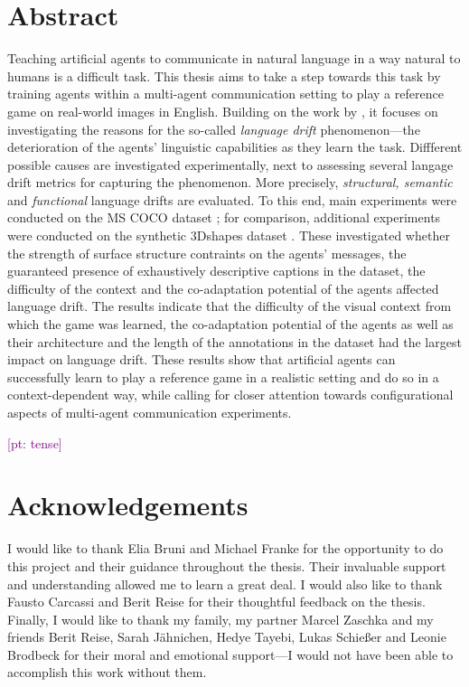 \documentclass[11pt, twoside, openright]{report} %
\newcommand{\pt}[1]{\textcolor{Purple}{[pt: #1]}}
\begin{document}


\chapter*{Abstract}
Teaching artificial agents to communicate in natural language in a way natural to humans is a difficult task. This thesis aims to take a step towards this task by training agents within a multi-agent communication setting to play a reference game on real-world images in English. Building on the work by \cite{lazaridou2020multi}, it focuses on investigating the reasons for the so-called \emph{language drift} phenomenon---the deterioration of the agents' linguistic capabilities as they learn the task. Diffferent possible causes are investigated experimentally, next to assessing several langage drift metrics for capturing the phenomenon. More precisely, \emph{structural, semantic} and \emph{functional} language drifts are evaluated.
To this end, main experiments were conducted on the MS COCO dataset \parencite{chen2015microsoft}; for comparison, additional experiments were conducted on the synthetic 3Dshapes dataset \parencite{burgess20183d}.
These investigated whether the strength of surface structure contraints on the agents' messages, the guaranteed presence of exhaustively descriptive captions in the dataset, the difficulty of the context and the co-adaptation potential of the agents affected language drift. The results indicate that the difficulty of the visual context from which the game was learned, the co-adaptation potential of the agents as well as their architecture and the length of the annotations in the dataset had the largest impact on language drift. These results show that artificial agents can successfully learn to play a reference game in a realistic setting and do so in a context-dependent way, while calling for closer attention towards configurational aspects of multi-agent communication experiments.  

\pt{tense}
\chapter*{Acknowledgements}

I would like to thank Elia Bruni and Michael Franke for the opportunity to do this project and their guidance throughout the thesis. Their invaluable support and understanding allowed me to learn a great deal. I would also like to thank Fausto Carcassi and Berit Reise for their thoughtful feedback on the thesis.
Finally, I would like to thank my family, my partner Marcel Zaschka and my friends Berit Reise, Sarah J\"ahnichen, Hedye Tayebi, Lukas Schießer and Leonie Brodbeck for their moral and emotional support---I would not have been able to accomplish this work without them.
\end{document}
